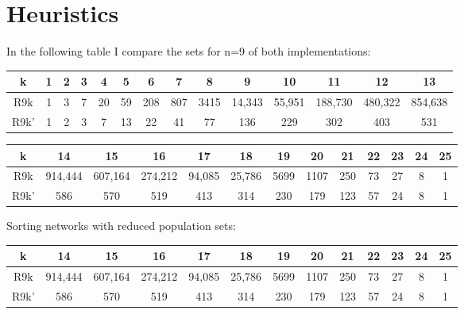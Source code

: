 \documentclass[../main.tex]{subfiles}
\begin{document}
	\section{Heuristics}
	In the following table I compare the sets for n=9 of both implementations:
	\begin{center}
		\begin{tabular}{||c c c c c c c c c c c c c c||} 
			\hline
			k & 1 & 2 & 3 & 4 & 5 & 6 & 7 & 8 & 9 & 10 & 11 & 12 & 13  \\ [0.5ex] 
			\hline\hline
			R9k& 1 & 3 & 7 & 20 & 59 & 208 & 807 & 3415 & 14,343 & 55,951 & 188,730 & 480,322 & 854,638 \\ 
			\hline
			R9k' & 1 & 2 & 3 & 7 & 13 & 22 & 41 & 77 & 136 & 229 & 302 & 403 & 531 \\  [1ex] 
			\hline
		\end{tabular}
	\end{center}
	\begin{center}
		\begin{tabular}{||c c c c c c c c c c c c c||} 
			\hline
			k & 14 & 15 & 16 & 17 & 18 & 19 & 20 & 21 & 22 & 23 & 24 & 25  \\ [0.5ex] 
			\hline\hline
			R9k & 914,444 & 607,164 & 274,212 & 94,085 & 25,786 & 5699 & 1107 & 250 & 73 & 27 & 8 & 1 \\ 
			\hline
			R9k' & 586 & 570 & 519 & 413 & 314 & 230 & 179 & 123 & 57 & 24 & 8 & 1 \\  [1ex] 
			\hline
		\end{tabular}
	\end{center}
	
	Sorting networks with reduced population sets:
		\begin{center}
		\begin{tabular}{||c c c c c c c c c c c c c||} 
			\hline
			k & 14 & 15 & 16 & 17 & 18 & 19 & 20 & 21 & 22 & 23 & 24 & 25  \\ [0.5ex] 
			\hline\hline
			R9k & 914,444 & 607,164 & 274,212 & 94,085 & 25,786 & 5699 & 1107 & 250 & 73 & 27 & 8 & 1 \\ 
			\hline
			R9k' & 586 & 570 & 519 & 413 & 314 & 230 & 179 & 123 & 57 & 24 & 8 & 1 \\  [1ex] 
			\hline
		\end{tabular}
	\end{center}
	

	\begin{sortingnetwork}{9}{15}{1}
	\end{sortingnetwork}
	
\end{document}
